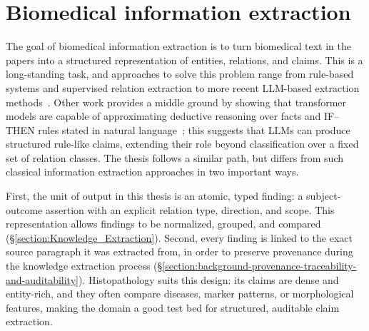 \section{Biomedical information extraction}\label{section:background-biomedical-info-extraction}

The goal of biomedical information extraction is to turn biomedical text in the papers into a structured representation of entities, relations, and claims. This is a long-standing task, and approaches to solve this problem range from rule-based systems and supervised relation extraction to more recent LLM-based extraction methods~\parencite{agrawal2022largelanguagemodels, gu2021biomedbert}. Other work provides a middle ground by showing that transformer models are capable of approximating deductive reasoning over facts and IF--THEN rules stated in natural language~\parencite{clark2020transformerssoftreasoners}; this suggests that LLMs can produce structured rule-like claims, extending their role beyond classification over a fixed set of relation classes. The thesis follows a similar path, but differs from such classical information extraction approaches in two important ways. 

First, the unit of output in this thesis is an atomic, typed finding: a subject-outcome assertion with an explicit relation type, direction, and scope. This representation allows findings to be normalized, grouped, and compared (§\ref{section:Knowledge_Extraction}). Second, every finding is linked to the exact source paragraph it was extracted from, in order to preserve provenance during the knowledge extraction process (§\ref{section:background-provenance-traceability-and-auditability}). Histopathology suits this design: its claims are dense and entity-rich, and they often compare diseases, marker patterns, or morphological features, making the domain a good test bed for structured, auditable claim extraction.